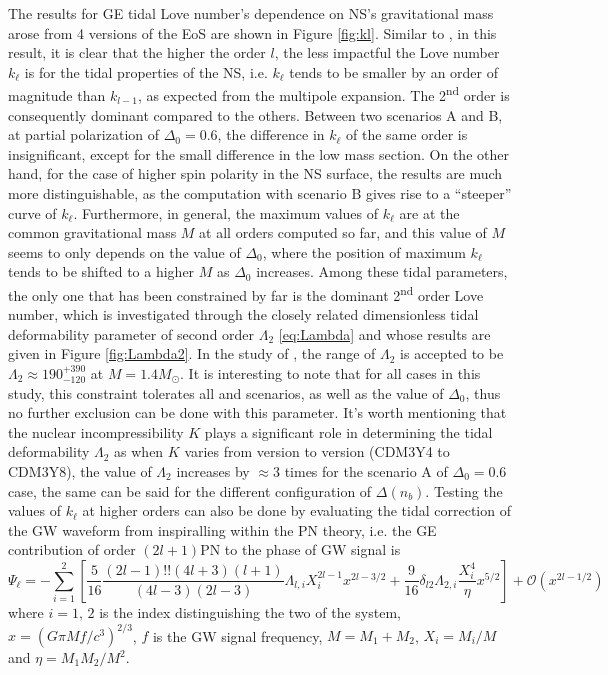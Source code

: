 The results for \gls{GE} tidal Love number's dependence on \gls{NS}'s gravitational mass arose from 4 versions of the \gls{EoS} are shown in Figure \ref{fig:kl}. Similar to \cite{perot2021role}, in this result, it is clear that the higher the order $l$, the less impactful the Love number $k_\ell$ is for the tidal properties of the \gls{NS}, i.e. $k_\ell$ tends to be smaller by an order of magnitude than $k_{l-1}$, as expected from the multipole expansion. The 2\textsuperscript{nd} order is consequently dominant compared to the others. Between two scenarios A and B, at partial polarization of $\Delta_0 = 0.6$, the difference in $k_\ell$ of the same order is insignificant, except for the small difference in the low mass section. On the other hand, for the case of higher spin polarity in the \gls{NS} surface, the results are much more distinguishable, as the computation with scenario B gives rise to a ``steeper'' curve of $k_\ell$. Furthermore, in general, the maximum values of $k_\ell$ are at the common gravitational mass $M$ at all orders computed so far, and this value of $M$ seems to only depends on the value of $\Delta_0$, where the position of maximum $k_\ell$ tends to be shifted to a higher $M$ as $\Delta_0$ increases. Among these tidal parameters, the only one that has been constrained by far is the dominant 2\textsuperscript{nd} order Love number, which is investigated through the closely related dimensionless tidal deformability parameter of second order $\Lambda_2$ \eqref{eq:Lambda} and whose results are given in Figure \ref{fig:Lambda2}. In the study of \cite{abbott2018gw170817}, the range of $\Lambda_2$ is accepted to be $\Lambda_2 \approx 190^{+390}_{-120}$ at $M=1.4M_\odot$. It is interesting to note that for all cases in this study, this constraint tolerates all  and scenarios, as well as the value of $\Delta_0$, thus no further exclusion can be done with this parameter. It's worth mentioning that the nuclear incompressibility $K$ plays a significant role in determining the tidal deformability $\Lambda_2$ as when $K$ varies from version to version (CDM3Y4 to CDM3Y8), the value of $\Lambda_2$ increases by $\approx 3$ times for the scenario A of $\Delta_0 = 0.6$ case, the same can be said for the different configuration of $\Delta(n_b)$. Testing the values of $k_\ell$ at higher orders can also be done by evaluating the tidal correction of the \gls{GW} waveform from inspiralling  within the PN theory, i.e. the \gls{GE} contribution of order $(2l+1)$PN to the phase of \gls{GW} signal is \citep{perot2021role, yagi2014multipole}
\begin{equation}
    \Psi_\ell = - \sum^{2}_{i=1} \left[ \frac{5}{16} \frac{(2l-1)!! (4l+3)(l+1)}{(4l-3)(2l-3)} \Lambda_{l,i} X_i^{2l-1} x^{2l - 3/2} + \frac{9}{16} \delta_{l2} \Lambda_{2, i} \frac{X_i^4}{\eta} x^{5/2} \right] + \mathcal{O}(x^{2l-1/2})
\end{equation}
where $i=1,\,2$ is the index distinguishing the two  of the system, $x=\left( G\pi Mf/c^3 \right)^{2/3}$, $f$ is the \gls{GW} signal frequency, $M=M_1 + M_2$, $X_i = M_i/M$ and $\eta = M_1 M_2/M^2$.

